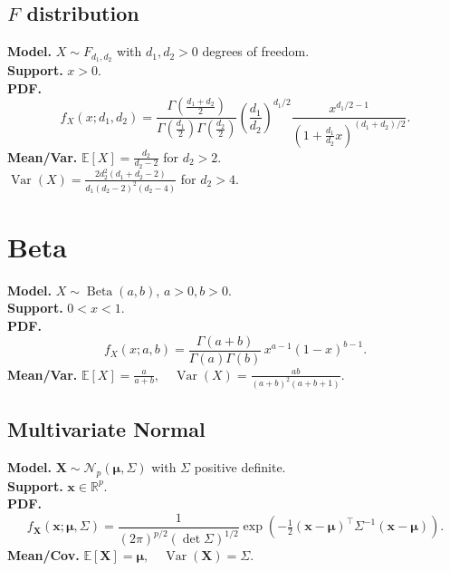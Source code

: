 \documentclass[
  letterpaper,
  DIV=11,
  numbers=noendperiod]{scrreprt}
\theoremstyle{definition}
\theoremstyle{plain}
\theoremstyle{definition}
\theoremstyle{remark}
\begin{document}
\subsection*{\texorpdfstring{\(F\)
distribution}{F distribution}}\label{sec-f}

\textbf{Model.} \(X \sim F_{d_1,d_2}\) with \(d_1,d_2>0\) degrees of
freedom.\\
\textbf{Support.} \(x>0\).\\
\textbf{PDF.} \[
f_X(x;d_1,d_2)=\frac{\Gamma\!\left(\frac{d_1+d_2}{2}\right)}{\Gamma\!\left(\frac{d_1}{2}\right)\Gamma\!\left(\frac{d_2}{2}\right)}
\left(\frac{d_1}{d_2}\right)^{d_1/2}\frac{x^{d_1/2-1}}{\left(1+\frac{d_1}{d_2}x\right)^{(d_1+d_2)/2}}.
\] \textbf{Mean/Var.} \(\mathbb{E}[X]=\frac{d_2}{d_2-2}\) for
\(d_2>2\).\\
\(\operatorname{Var}(X)=\frac{2d_2^2(d_1+d_2-2)}{d_1(d_2-2)^2(d_2-4)}\)
for \(d_2>4\).

\section*{Beta}\label{sec-beta}


\textbf{Model.} \(X \sim \operatorname{Beta}(a,b)\), \(a>0, b>0\).\\
\textbf{Support.} \(0<x<1\).\\
\textbf{PDF.} \[
f_X(x;a,b)=\frac{\Gamma(a+b)}{\Gamma(a)\Gamma(b)}\,x^{a-1}(1-x)^{b-1}.
\] \textbf{Mean/Var.}
\(\mathbb{E}[X]=\frac{a}{a+b},\quad \operatorname{Var}(X)=\frac{ab}{(a+b)^2(a+b+1)}.\)

\subsection*{Multivariate Normal}\label{sec-mvnorm}

\textbf{Model.}
\(\mathbf{X} \sim \mathcal{N}_p(\boldsymbol{\mu},\Sigma)\) with
\(\Sigma\) positive definite.\\
\textbf{Support.} \(\mathbf{x}\in\mathbb{R}^p\).\\
\textbf{PDF.} \[
f_{\mathbf{X}}(\mathbf{x};\boldsymbol{\mu},\Sigma)=\frac{1}{(2\pi)^{p/2}(\det\Sigma)^{1/2}}
\exp\!\left(-\tfrac{1}{2}(\mathbf{x}-\boldsymbol{\mu})^\top \Sigma^{-1}(\mathbf{x}-\boldsymbol{\mu})\right).
\] \textbf{Mean/Cov.}
\(\mathbb{E}[\mathbf{X}]=\boldsymbol{\mu},\quad \operatorname{Var}(\mathbf{X})=\Sigma.\)
\end{document}
